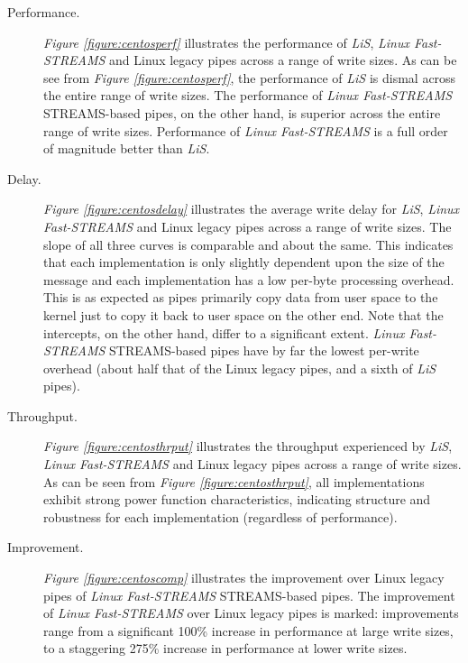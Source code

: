 \documentclass[letterpaper,final,notitlepage,twocolumn,10pt,twoside]{article}
\begin{document}
\begin{description}

\item[Performance.]

\textit{Figure \ref{figure:centosperf}}
illustrates the performance of \textsl{LiS}, \textsl{Linux Fast-STREAMS} and Linux legacy pipes
across a range of write sizes.  As can be see from \textit{Figure \ref{figure:centosperf}}, the
performance of \textsl{LiS} is dismal across the entire range of write sizes.  The performance of
\textsl{Linux Fast-STREAMS} STREAMS-based pipes, on the other hand, is superior across the entire
range of write sizes.  Performance of \textsl{Linux Fast-STREAMS} is a full order of magnitude
better than \textsl{LiS}.

\item[Delay.]

\textit{Figure \ref{figure:centosdelay}}
illustrates the average write delay for \textsl{LiS}, \textsl{Linux Fast-STREAMS} and Linux legacy
pipes across a range of write sizes.  The slope of all three curves is comparable and about the
same.  This indicates that each implementation is only slightly dependent upon the size of the
message and each implementation has a low per-byte processing overhead.  This is as expected as
pipes primarily copy data from user space to the kernel just to copy it back to user space on the
other end.  Note that the intercepts, on the other hand, differ to a significant extent.
\textsl{Linux Fast-STREAMS} STREAMS-based pipes have by far the lowest per-write overhead (about
half that of the Linux legacy pipes, and a sixth of \textsl{LiS} pipes).

\item[Throughput.]

\textit{Figure \ref{figure:centosthrput}}
illustrates the throughput experienced by \textsl{LiS}, \textsl{Linux Fast-STREAMS} and Linux legacy
pipes across a range of write sizes.  As can be seen from \textit{Figure \ref{figure:centosthrput}},
all implementations exhibit strong power function characteristics, indicating structure and
robustness for each implementation (regardless of performance).

\item[Improvement.]

\textit{Figure \ref{figure:centoscomp}}
illustrates the improvement over Linux legacy pipes of \textsl{Linux Fast-STREAMS} STREAMS-based
pipes.  The improvement of \textsl{Linux Fast-STREAMS} over Linux legacy pipes is marked:
improvements range from a significant 100\% increase in performance at large write sizes, to a
staggering 275\% increase in performance at lower write sizes.

\end{description}
\end{document}

